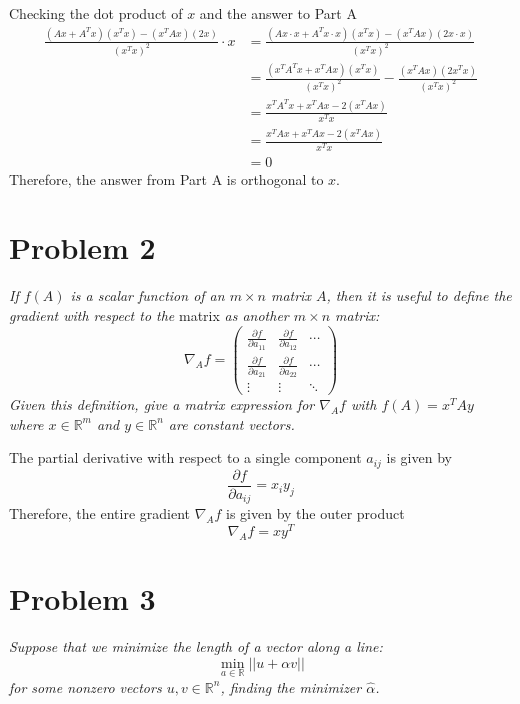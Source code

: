 \documentclass{article}
\begin{document}
Checking the dot product of $x$ and the answer to Part A
\begin{align*}
    \frac{(Ax + A^T x) (x^T x) - (x^T A x)(2x)}{(x^T x)^2} \cdot x &=
    \frac{(Ax \cdot x + A^T x \cdot x)(x^T x) - (x^T A x)(2x \cdot x)}{(x^T x)^2} \\
    &= \frac{(x^T A^T x + x^T A x)(x^T x)}{(x^T x)^2} - \frac{(x^T A x)(2x^T x)}{(x^T x)^2} \\
    &= \frac{x^T A^T x + x^T A x - 2(x^T A x)}{x^T x} \\
    &= \frac{x^T A x + x^T A x - 2 (x^T A x)}{x^T x} \\
    &= 0
\end{align*}
Therefore, the answer from Part A is orthogonal to $x$.

\section*{Problem 2}

\textit{If $f(A)$ is a scalar function of an $m \times n$ matrix $A$, then it
is useful to define the gradient with respect to the} matrix \textit{as
another $m \times n$ matrix:}
$$ \nabla_A f = \begin{pmatrix}
    \frac{\partial f}{\partial a_{11}} & \frac{\partial f}{\partial a_{12}} & \cdots \\
    \frac{\partial f}{\partial a_{21}} & \frac{\partial f}{\partial a_{22}} & \cdots \\
    \vdots & \vdots & \ddots
\end{pmatrix} $$
\textit{Given this definition, give a matrix expression for $\nabla_A f$ with
$f(A) = x^T A y$ where $x \in \mathbb{R}^m$ and $y \in \mathbb{R}^n$ are
constant vectors.}

\bigbreak

The partial derivative with respect to a single component $a_{ij}$ is given by
$$ \frac{\partial f}{\partial a_{ij}} = x_i y_j $$
Therefore, the entire gradient $\nabla_A f$ is given by the outer product
$$ \nabla_A f = x y^T $$

\section*{Problem 3}

\textit{Suppose that we minimize the length of a vector along a line:}
$$ \min_{a \in \mathbb{R}} || u + \alpha v || $$
\textit{for some nonzero vectors $u, v \in \mathbb{R}^n$, finding the
minimizer $\hat{\alpha}$.}
\end{document}
